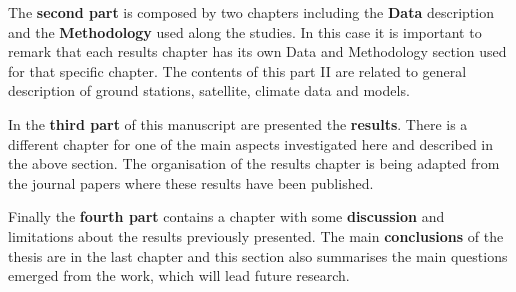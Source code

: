 The \textbf{second part} is composed by two chapters including the \textbf{Data} description and the \textbf{Methodology} used along the studies. In this case it is important to remark that each results chapter has its own Data and Methodology section used for that specific chapter. The contents of this part II are related to general description of ground stations, satellite, climate data and models.

In the \textbf{third part} of this manuscript are presented the \textbf{results}. There is a different chapter for one of the main aspects investigated here and described in the above section. The organisation of the results chapter is being adapted from the journal papers where these results have been published.

Finally the \textbf{fourth part} contains a chapter with some \textbf{discussion} and limitations about the results previously presented. The main \textbf{conclusions} of the thesis are in the last chapter and this section also summarises the main questions emerged from the work, which will lead future research.


